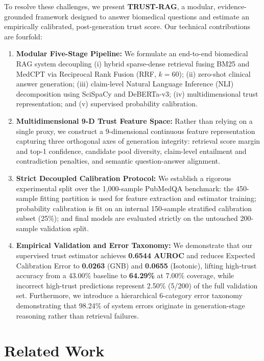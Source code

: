 \documentclass[journal,10pt]{IEEEtran}
\begin{document}
To resolve these challenges, we present \textbf{TRUST-RAG}, a modular, evidence-grounded framework designed to answer biomedical questions and estimate an empirically calibrated, post-generation trust score. Our technical contributions are fourfold:
\begin{enumerate}
    \item \textbf{Modular Five-Stage Pipeline:} We formulate an end-to-end biomedical RAG system decoupling (i) hybrid sparse-dense retrieval fusing BM25 and MedCPT via Reciprocal Rank Fusion (RRF, $k=60$); (ii) zero-shot clinical answer generation; (iii) claim-level Natural Language Inference (NLI) decomposition using SciSpaCy and DeBERTa-v3; (iv) multidimensional trust representation; and (v) supervised probability calibration.
    \item \textbf{Multidimensional 9-D Trust Feature Space:} Rather than relying on a single proxy, we construct a 9-dimensional continuous feature representation capturing three orthogonal axes of generation integrity: retrieval score margin and top-1 confidence, candidate pool diversity, claim-level entailment and contradiction penalties, and semantic question-answer alignment.
    \item \textbf{Strict Decoupled Calibration Protocol:} We establish a rigorous experimental split over the 1,000-sample PubMedQA benchmark: the 450-sample fitting partition is used for feature extraction and estimator training; probability calibration is fit on an internal 150-sample stratified calibration subset (25\%); and final models are evaluated strictly on the untouched 200-sample validation split.
    \item \textbf{Empirical Validation and Error Taxonomy:} We demonstrate that our supervised trust estimator achieves \textbf{0.6544 AUROC} and reduces Expected Calibration Error to \textbf{0.0263} (GNB) and \textbf{0.0655} (Isotonic), lifting high-trust accuracy from a 43.00\% baseline to \textbf{64.29\%} at 7.00\% coverage, while incorrect high-trust predictions represent 2.50\% (5/200) of the full validation set. Furthermore, we introduce a hierarchical 6-category error taxonomy demonstrating that 98.24\% of system errors originate in generation-stage reasoning rather than retrieval failures.
\end{enumerate}

\section{Related Work}
\end{document}
